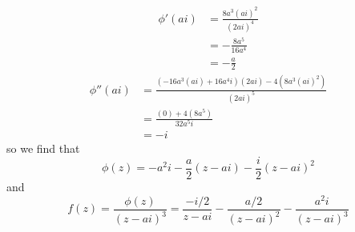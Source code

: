 \documentclass{article}
\begin{document}
\begin{align*}
	\phi'(ai)
	&= \frac{8a^3(ai)^2}{(2ai)^4} \\
	&= -\frac{8a^5}{16a^4} \\
	&= -\frac{a}{2}
\end{align*}
\begin{align*}
	\phi''(ai)
	&= \frac{(-16a^3(ai) + 16a^4 i)(2ai) - 4(8a^3(ai)^2)}{(2ai)^5} \\
	&= \frac{(0) + 4(8a^5)}{32a^5 i} \\
	&= -i
\end{align*}
so we find that
\[
	\phi(z)
	= -a^2 i - \frac{a}{2} (z - ai) - \frac{i}{2} (z - ai)^2
\]
and
\[
	f(z) = \frac{\phi(z)}{(z - ai)^3}
	= \frac{-i/2}{z - ai} - \frac{a/2}{(z - ai)^2} - \frac{a^2 i}{(z - ai)^3}
\]
\end{document}
